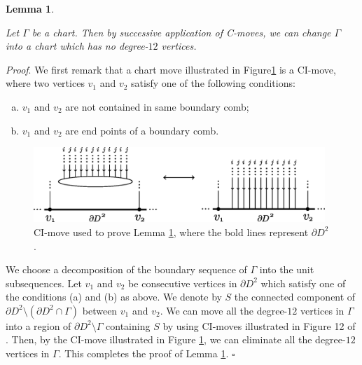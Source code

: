 \documentclass{amsart}
\theoremstyle{plain}
\newtheorem{lem}[thm]{Lemma}
\theoremstyle{definition}
\begin{document}
\begin{lem}\label{vanish12}

Let $\Gamma$ be a chart. Then by successive application of C-moves, we can change $\Gamma$ into a chart which has no degree-$12$ vertices. 

\end{lem}

{\it Proof}. We first remark that a chart move illustrated in Figure\ref{moves12} is a CI-move, 
where two vertices $v_1$ and $v_2$ satisfy one of the following conditions: 

\begin{enumerate}[(a)]

\item $v_1$ and $v_2$ are not contained in same boundary comb; 

\item $v_1$ and $v_2$ are end points of a boundary comb. 

\end{enumerate}

\begin{figure}[htbp]
\begin{center}
\includegraphics[width=110mm]{moves12.eps}
\end{center}
\caption{CI-move used to prove Lemma \ref{vanish12}, 
where the bold lines represent $\partial D^2$. }
\label{moves12}
\end{figure}

We choose a decomposition of the boundary sequence of $\Gamma$ into the unit subsequences. 
Let $v_1$ and $v_2$ be consecutive vertices in $\partial D^2$ which satisfy one of the conditions (a) and (b) as above. 
We denote by $S$ the connected component of $\partial D^2\setminus(\partial D^2\cap\Gamma)$ between $v_1$ and $v_2$. 
We can move all the degree-$12$ vertices in $\Gamma$ into a region of $\partial D^2\setminus \Gamma$ containing $S$ 
by using CI-moves illustrated in Figure 12 of \cite{KMMW}. 
Then, by the CI-move illustrated in Figure \ref{moves12}, we can eliminate all the degree-$12$ vertices in $\Gamma$. 
This completes the proof of Lemma \ref{vanish12}. \hfill $\square$
\end{document}
